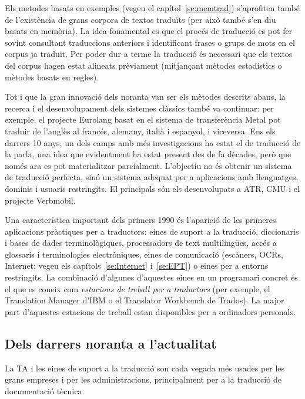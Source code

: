 Els metodes basats en exemples (vegeu el capítol~\ref{se:memtrad})
s'aprofiten també de l'existència de grans corpora de textos
traduïts (per això també s'en diu basats en memòria). La idea
fonamental es que el procés de traducció es pot fer sovint consultant
traduccions anteriors i identificant frases o grups de mots en el
corpus ja traduït. Per poder dur a terme la traducció és necessari que
els textos del corpus hagen estat alineats prèviament (mitjançant
mètodes estadístics o mètodes basats en regles).

Tot i que la gran innovació dels noranta van ser els mètodes descrits
abans, 
la recerca i el desenvolupament 
dels sistemes clàssics també va continuar: 
per exemple, el projecte Eurolang basat en el sistema de 
transferència Metal pot traduir de l'anglès al 
francés, alemany, italià i espanyol, i 
viceversa.
Ens els darrers 10 anys, un dels camps amb més 
investigacions ha estat el de traducció de la 
parla, una idea que evidentment ha estat 
present des de fa dècades, però que només ara es pot 
materialitzar parcialment. 
L'objectiu no és obtenir un sistema de traducció perfecta, 
sinó un sistema adequat per a aplicacions amb 
llenguatges, dominis i usuaris restringits. El 
principals són els desenvolupats a ATR, 
CMU i el projecte Verbmobil.

Una característica important dels primers 1990 és l'aparició 
de les primeres aplicacions 
pràctiques per a traductors: eines de suport a la traducció, 
diccionaris i bases de dades 
terminològiques, processadors de text multilingües, 
accés a glossaris i terminologies 
electròniques, eines de comunicació (escàners, OCRs, Internet;
vegeu els capítols~\ref{se:Internet} i~\ref{se:EPT}) o 
eines per a entorns restringits. 
La combinació d'algunes d'aquestes eines en un 
programari concret és el que es coneix com 
\emph{estacions de treball per a traductors} (per exemple, el 
Translation Manager d'IBM o el Translator 
Workbench de Trados). La major part 
d'aquestes estacions de treball estan disponibles per a 
ordinadors personals.

\subsection{Dels darrers noranta a l'actualitat}

La TA i les eines de suport a la traducció son cada 
vegada més usades per les grans empreses i 
per les administracions, principalment per a la 
traducció de documentació tècnica. 

